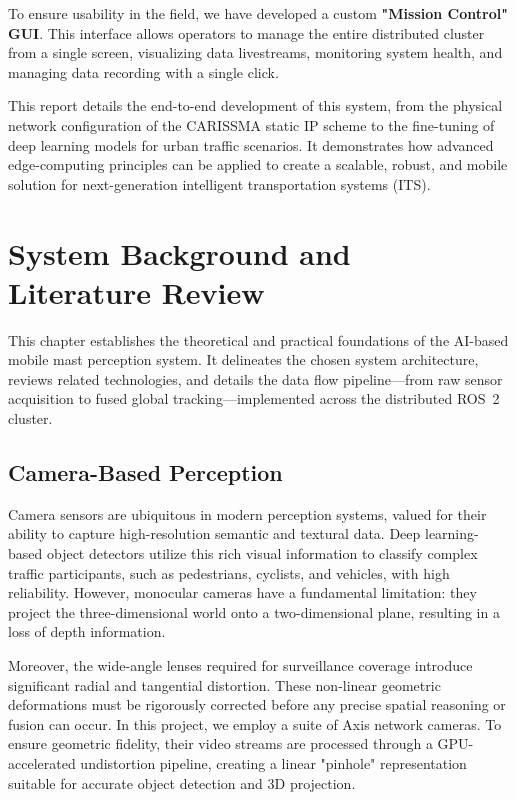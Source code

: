 \documentclass[12pt,a4paper]{report}
\begin{document}
To ensure usability in the field, we have developed a custom \textbf{"Mission Control" GUI}. This interface allows operators to manage the entire distributed cluster from a single screen, visualizing data livestreams, monitoring system health, and managing data recording with a single click.

This report details the end-to-end development of this system, from the physical network configuration of the CARISSMA static IP scheme to the fine-tuning of deep learning models for urban traffic scenarios. It demonstrates how advanced edge-computing principles can be applied to create a scalable, robust, and mobile solution for next-generation intelligent transportation systems (ITS).

\chapter[System Background]{System Background and \\ Literature Review}

This chapter establishes the theoretical and practical foundations of the AI-based mobile mast perception system. It delineates the chosen system architecture, reviews related technologies, and details the data flow pipeline—from raw sensor acquisition to fused global tracking—implemented across the distributed ROS~2 cluster.

\section{Camera-Based Perception}
Camera sensors are ubiquitous in modern perception systems, valued for their ability to capture high-resolution semantic and textural data. Deep learning-based object detectors utilize this rich visual information to classify complex traffic participants, such as pedestrians, cyclists, and vehicles, with high reliability. However, monocular cameras have a fundamental limitation: they project the three-dimensional world onto a two-dimensional plane, resulting in a loss of depth information.

Moreover, the wide-angle lenses required for surveillance coverage introduce significant radial and tangential distortion. These non-linear geometric deformations must be rigorously corrected before any precise spatial reasoning or fusion can occur. In this project, we employ a suite of Axis network cameras. To ensure geometric fidelity, their video streams are processed through a GPU-accelerated undistortion pipeline, creating a linear "pinhole" representation suitable for accurate object detection and 3D projection.
\end{document}
